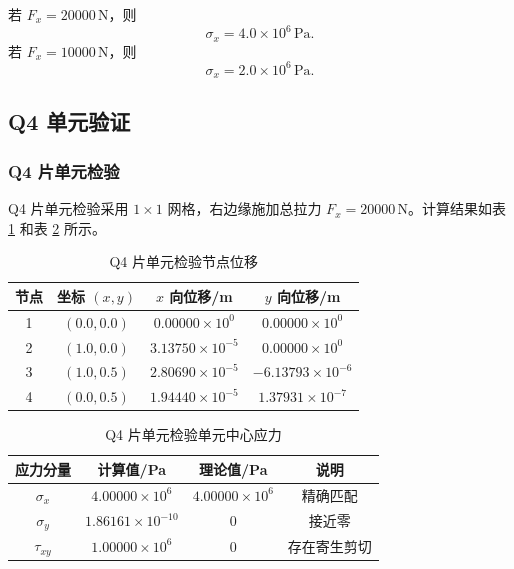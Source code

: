 \documentclass[UTF8,a4paper,zihao=-4]{ctexart}
\begin{document}
若 $F_x=20000\,\mathrm{N}$，则
\[
    \sigma_x=4.0\times 10^{6}\,\mathrm{Pa}.
\]
若 $F_x=10000\,\mathrm{N}$，则
\[
    \sigma_x=2.0\times 10^{6}\,\mathrm{Pa}.
\]

\subsection{Q4 单元验证}

\subsubsection{Q4 片单元检验}

Q4 片单元检验采用 $1\times1$ 网格，右边缘施加总拉力 $F_x=20000\,\mathrm{N}$。计算结果如表 \ref{tab:q4_patch_disp} 和表 \ref{tab:q4_patch_stress} 所示。

\begin{table}[H]
    \centering
    \caption{Q4 片单元检验节点位移}
    \label{tab:q4_patch_disp}
    \begin{tabular}{cccc}
        \toprule
        节点 & 坐标 $(x,y)$ & $x$ 向位移/m & $y$ 向位移/m\\
        \midrule
        1 & $(0.0,0.0)$ & $0.00000\times10^{0}$ & $0.00000\times10^{0}$\\
        2 & $(1.0,0.0)$ & $3.13750\times10^{-5}$ & $0.00000\times10^{0}$\\
        3 & $(1.0,0.5)$ & $2.80690\times10^{-5}$ & $-6.13793\times10^{-6}$\\
        4 & $(0.0,0.5)$ & $1.94440\times10^{-5}$ & $1.37931\times10^{-7}$\\
        \bottomrule
    \end{tabular}
\end{table}

\begin{table}[H]
    \centering
    \caption{Q4 片单元检验单元中心应力}
    \label{tab:q4_patch_stress}
    \begin{tabular}{cccc}
        \toprule
        应力分量 & 计算值/Pa & 理论值/Pa & 说明\\
        \midrule
        $\sigma_x$ & $4.00000\times10^{6}$ & $4.00000\times10^{6}$ & 精确匹配\\
        $\sigma_y$ & $1.86161\times10^{-10}$ & $0$ & 接近零\\
        $\tau_{xy}$ & $1.00000\times10^{6}$ & $0$ & 存在寄生剪切\\
        \bottomrule
    \end{tabular}
\end{table}
\end{document}
